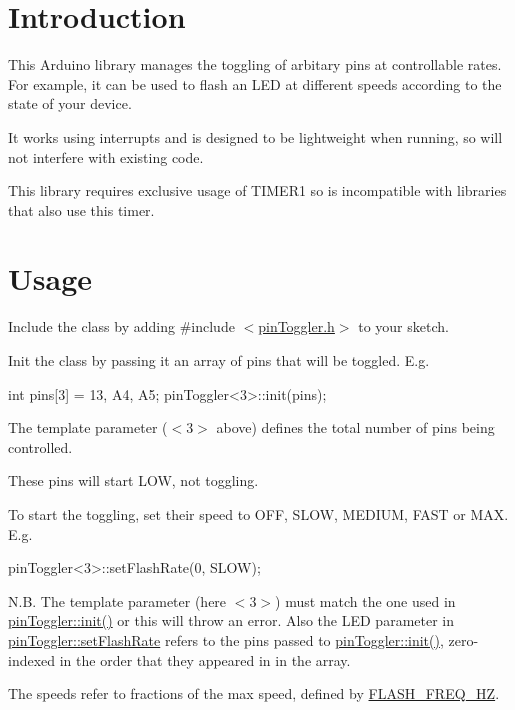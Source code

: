 \hypertarget{index_Introduction}{}\section{Introduction}\label{index_Introduction}
This Arduino library manages the toggling of arbitary pins at controllable rates. For example, it can be used to flash an L\+ED at different speeds according to the state of your device.

It works using interrupts and is designed to be lightweight when running, so will not interfere with existing code.

This library requires exclusive usage of T\+I\+M\+E\+R1 so is incompatible with libraries that also use this timer.\hypertarget{index_Usage}{}\section{Usage}\label{index_Usage}
Include the class by adding {\ttfamily \#include $<$\hyperlink{pin_toggler_8h}{pin\+Toggler.\+h}$>$} to your sketch.

Init the class by passing it an array of pins that will be toggled. E.\+g. \begin{DoxyVerb}int pins[3] = {13, A4, A5};
pinToggler<3>::init(pins);
\end{DoxyVerb}


The template parameter ({\ttfamily $<$3$>$} above) defines the total number of pins being controlled.

These pins will start {\ttfamily L\+OW}, not toggling.

To start the toggling, set their speed to {\ttfamily O\+FF}, {\ttfamily S\+L\+OW}, {\ttfamily M\+E\+D\+I\+UM}, {\ttfamily F\+A\+ST} or {\ttfamily M\+AX}. E.\+g. \begin{DoxyVerb}pinToggler<3>::setFlashRate(0, SLOW);
\end{DoxyVerb}


N.\+B. The template parameter (here {\ttfamily $<$3$>$}) must match the one used in \hyperlink{classpin_toggler_aa58211817601d0e2dd413eb63e41f773}{pin\+Toggler\+::init()} or this will throw an error. Also the L\+ED parameter in \hyperlink{classpin_toggler_a42ae0ac4f841dae592195f26bffb109e}{pin\+Toggler\+::set\+Flash\+Rate} refers to the pins passed to \hyperlink{classpin_toggler_aa58211817601d0e2dd413eb63e41f773}{pin\+Toggler\+::init()}, zero-\/indexed in the order that they appeared in in the array.

The speeds refer to fractions of the max speed, defined by \hyperlink{pin_toggler_8h_a1097b75ec2a0f9ad2e6d4f6c4500d224}{F\+L\+A\+S\+H\+\_\+\+F\+R\+E\+Q\+\_\+\+HZ}.

